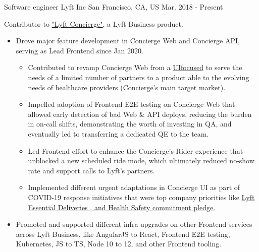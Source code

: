 


\begin{cventries}
	
	
	\cventry
	{Software engineer} %
	{Lyft Inc} %
	{San Francisco, CA, US} %
	{Mar. 2018 - Present} %
	{ %
		\begin{cvitems}
			\item {Contributor to \href{https://support.lyftbusiness.com/hc/en-us/articles/360018624554}{"Lyft Concierge"\space\faExternalLink}, a Lyft Business product.}
			\begin{itemize}
				\item {Drove major feature development in Concierge Web and Concierge API, serving as Lead Frontend since Jan 2020.}
				\begin{itemize}
					\item {Contributed to revamp Concierge Web from a \href{https://techcrunch.com/2018/01/16/lyft-opens-up-concierge-its-ride-booking-service-for-businesses-to-all/}{UI\space\faExternalLink\space focused} to serve the needs of a limited number of partners to a product able to the evolving needs of healthcare providers (Concierge's main target market)}.
					\item {Impelled adoption of Frontend E2E testing on Concierge Web that allowed early detection of bad Web \& API deploys, reducing the burden in on-call shifts, demonstrating the worth of investing in QA, and eventually led to transferring a dedicated QE to the team.}
					\item{Led Frontend effort to enhance the Concierge's Rider experience that unblocked a new scheduled ride mode, which ultimately reduced no-show rate and support calls to Lyft's partners.}
					\item {Implemented different urgent adaptations in Concierge UI as part of COVID-19 response initiatives that were top company priorities like \href{https://support.lyftbusiness.com/hc/en-us/articles/360046169254}{Lyft Essential Deliveries \space\faExternalLink, and Health Safety commitment pledge.}}
				\end{itemize}
				\item{Promoted and supported different infra upgrades on other Frontend services across Lyft Business, like AngularJS to React, Frontend E2E testing, Kubernetes, JS to TS, Node 10 to 12, and other Frontend tooling.}
			\end{itemize}
		\end{cvitems}
	}
		

\end{cventries}
